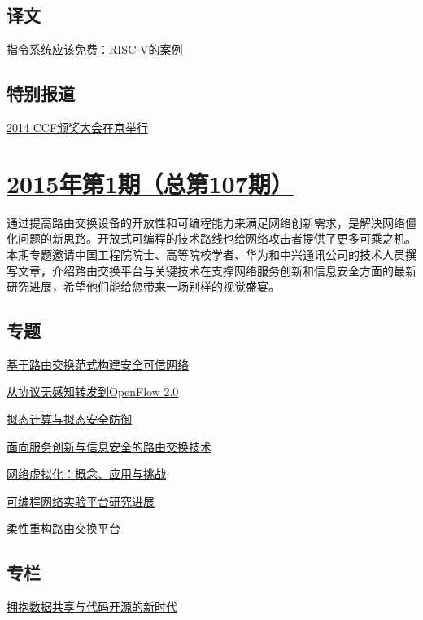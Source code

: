 \documentclass[a4paper]{article}
\begin{document}
\subsection{译文}
\href{http://history.ccf.org.cn/resources/1190201776262/2015/02/12/13.pdf}{指令系统应该免费：RISC-V的案例}

\subsection{特别报道}
\href{http://history.ccf.org.cn/resources/1190201776262/2015/02/12/1.pdf}{2014 CCF颁奖大会在京举行}


\section{\href{http://history.ccf.org.cn/sites/ccf/jsjtbbd.jsp?contentId=2842044881493}{\textbf{2015年第1期（总第107期）}}}
通过提高路由交换设备的开放性和可编程能力来满足网络创新需求，是解决网络僵化问题的新思路。开放式可编程的技术路线也给网络攻击者提供了更多可乘之机。本期专题邀请中国工程院院士、高等院校学者、华为和中兴通讯公司的技术人员撰写文章，介绍路由交换平台与关键技术在支撑网络服务创新和信息安全方面的最新研究进展，希望他们能给您带来一场别样的视觉盛宴。
\subsection{专题}
\href{http://history.ccf.org.cn/resources/1190201776262/2015/01/13/5.pdf}{基于路由交换范式构建安全可信网络}

\href{http://history.ccf.org.cn/resources/1190201776262/2015/01/13/6.pdf}{从协议无感知转发到OpenFlow 2.0}

\href{http://history.ccf.org.cn/resources/1190201776262/2015/01/13/2.pdf}{拟态计算与拟态安全防御}

\href{http://history.ccf.org.cn/resources/1190201776262/2015/01/12/1.pdf}{面向服务创新与信息安全的路由交换技术}

\href{http://history.ccf.org.cn/resources/1190201776262/2015/01/13/3.pdf}{网络虚拟化：概念、应用与挑战}

\href{http://history.ccf.org.cn/resources/1190201776262/2015/01/12/4.pdf}{可编程网络实验平台研究进展}

\href{http://history.ccf.org.cn/resources/1190201776262/2015/01/12/7.pdf}{柔性重构路由交换平台}

\subsection{专栏}
\href{http://history.ccf.org.cn/resources/1190201776262/2015/01/12/10.pdf}{拥抱数据共享与代码开源的新时代}
\end{document}
